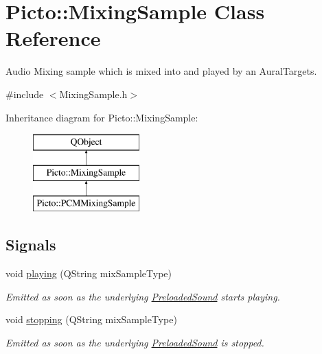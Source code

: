 \hypertarget{class_picto_1_1_mixing_sample}{\section{Picto\-:\-:Mixing\-Sample Class Reference}
\label{class_picto_1_1_mixing_sample}
}


Audio Mixing sample which is mixed into and played by an Aural\-Targets.  




{\ttfamily \#include $<$Mixing\-Sample.\-h$>$}

Inheritance diagram for Picto\-:\-:Mixing\-Sample\-:\begin{figure}[H]
\begin{center}
\leavevmode
\includegraphics[height=3.000000cm]{class_picto_1_1_mixing_sample}
\end{center}
\end{figure}
\subsection*{Signals}
\begin{DoxyCompactItemize}
\item 
\hypertarget{class_picto_1_1_mixing_sample_ae07a137f279f3a2742650d5720a98392}{void \hyperlink{class_picto_1_1_mixing_sample_ae07a137f279f3a2742650d5720a98392}{playing} (Q\-String mix\-Sample\-Type)}\label{class_picto_1_1_mixing_sample_ae07a137f279f3a2742650d5720a98392}

\begin{DoxyCompactList}\small\item\em Emitted as soon as the underlying \hyperlink{class_picto_1_1_preloaded_sound}{Preloaded\-Sound} starts playing. \end{DoxyCompactList}\item 
void \hyperlink{class_picto_1_1_mixing_sample_a3ed5591297ef852a49e63c879d9e6c9b}{stopping} (Q\-String mix\-Sample\-Type)
\begin{DoxyCompactList}\small\item\em Emitted as soon as the underlying \hyperlink{class_picto_1_1_preloaded_sound}{Preloaded\-Sound} is stopped. \end{DoxyCompactList}\end{DoxyCompactItemize}
